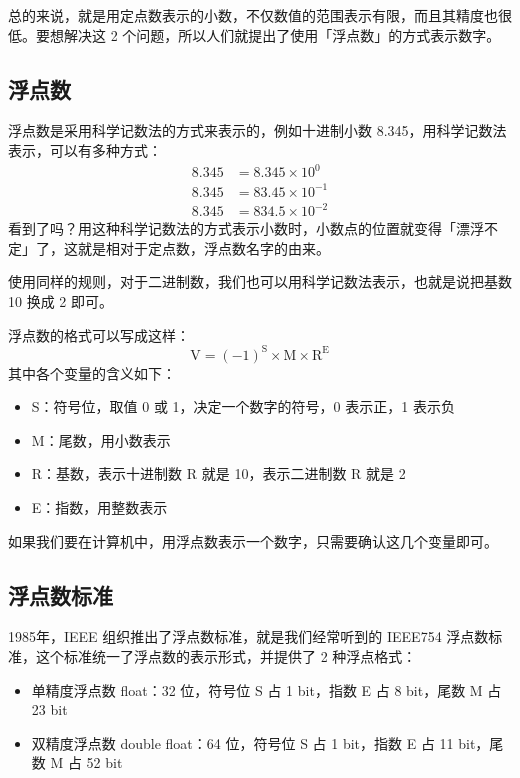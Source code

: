 总的来说，就是用定点数表示的小数，不仅数值的范围表示有限，而且其精度也很低。要想解决这 2 个问题，所以人们就提出了使用「浮点数」的方式表示数字。

\subsection{浮点数}

浮点数是采用科学记数法的方式来表示的，例如十进制小数 8.345，用科学记数法表示，可以有多种方式：
\begin{align*}
  8.345 &= 8.345 \times 10^0 \\
  8.345 &= 83.45 \times 10^{-1} \\
  8.345 &= 834.5 \times 10^{-2}
\end{align*}
看到了吗？用这种科学记数法的方式表示小数时，小数点的位置就变得「漂浮不定」了，这就是相对于定点数，浮点数名字的由来。

使用同样的规则，对于二进制数，我们也可以用科学记数法表示，也就是说把基数 10 换成 2 即可。

浮点数的格式可以写成这样：
\[
  \mathrm{V} = (-1)^\mathrm{S} \times \mathrm{M} \times \mathrm{R}^\mathrm{E}
\]
其中各个变量的含义如下：
\begin{itemize}
  \item S：符号位，取值 0 或 1，决定一个数字的符号，0 表示正，1 表示负
  \item M：尾数，用小数表示
  \item R：基数，表示十进制数 R 就是 10，表示二进制数 R 就是 2
  \item E：指数，用整数表示
\end{itemize}

如果我们要在计算机中，用浮点数表示一个数字，只需要确认这几个变量即可。

\subsection{浮点数标准}

1985年，IEEE 组织推出了浮点数标准，就是我们经常听到的 IEEE754 浮点数标准，这个标准统一了浮点数的表示形式，并提供了 2 种浮点格式：

\begin{itemize}
  \item 单精度浮点数 float：32 位，符号位 S 占 1 bit，指数 E 占 8 bit，尾数 M 占 23 bit
  \item 双精度浮点数 double float：64 位，符号位 S 占 1 bit，指数 E 占 11 bit，尾数 M 占 52 bit
\end{itemize}


